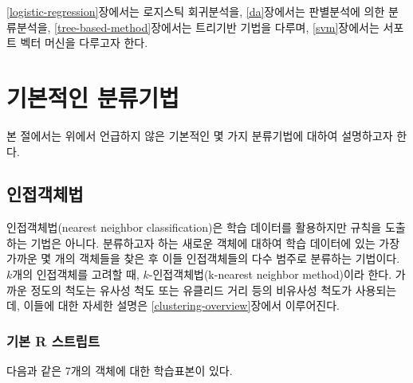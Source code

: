 \documentclass[
]{book}
\begin{document}
\ref{logistic-regression}장에서는 로지스틱 회귀분석을, \ref{da}장에서는 판별분석에 의한 분류분석을, \ref{tree-based-method}장에서는 트리기반 기법을 다루며, \ref{svm}장에서는 서포트 벡터 머신을 다루고자 한다.

\hypertarget{simple-classification-methods}{%
\section{기본적인 분류기법}\label{simple-classification-methods}}

본 절에서는 위에서 언급하지 않은 기본적인 몇 가지 분류기법에 대하여 설명하고자 한다.

\hypertarget{nearest-neighbor-classification}{%
\subsection{인접객체법}\label{nearest-neighbor-classification}}

인접객체법(nearest neighbor classification)은 학습 데이터를 활용하지만 규칙을 도출하는 기법은 아니다. 분류하고자 하는 새로운 객체에 대하여 학습 데이터에 있는 가장 가까운 몇 개의 객체들을 찾은 후 이들 인접객체들의 다수 범주로 분류하는 기법이다. \(k\)개의 인접객체를 고려할 때, \(k\)-인접객체법(k-nearest neighbor method)이라 한다. 가까운 정도의 척도는 유사성 척도 또는 유클리드 거리 등의 비유사성 척도가 사용되는데, 이들에 대한 자세한 설명은 \ref{clustering-overview}장에서 이루어진다.

\hypertarget{nearest-neighbor-classificaiton-basic-script}{%
\subsubsection{기본 R 스트립트}\label{nearest-neighbor-classificaiton-basic-script}}

다음과 같은 7개의 객체에 대한 학습표본이 있다.
\end{document}
